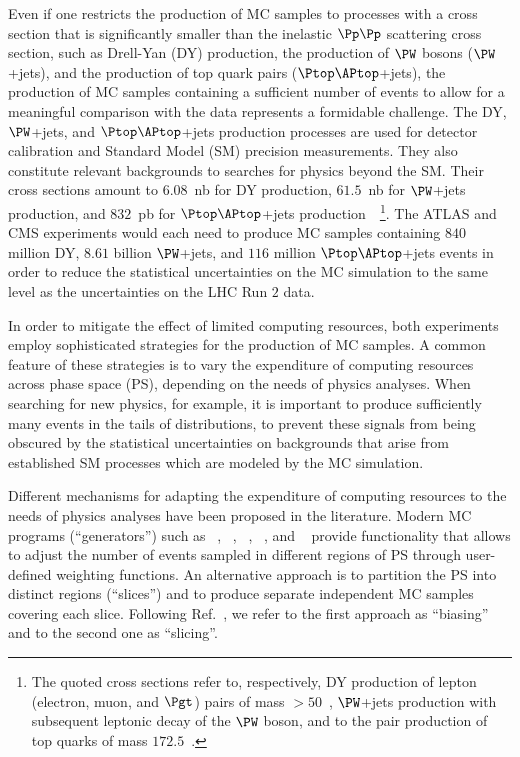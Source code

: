 Even if one restricts the production of MC samples to processes with a cross section that is significantly smaller than the inelastic $\Pp\Pp$ scattering cross section,
such as Drell-Yan (DY) production, the production of $\PW$ bosons ($\PW$+jets), and the production of top quark pairs ($\Ptop\APtop$+jets),
the production of MC samples containing a sufficient number of events to allow for a meaningful comparison with the data represents a formidable challenge.
The DY, $\PW$+jets, and $\Ptop\APtop$+jets production processes are used for detector calibration and Standard Model (SM) precision measurements.
They also constitute relevant backgrounds to searches for physics beyond the SM.
Their cross sections amount to $6.08$~nb for DY production, $61.5$~nb for $\PW$+jets production,
and $832$~pb for $\Ptop\APtop$+jets production~\cite{Melnikov:2006kv,Li:2012wna,Czakon:2011xx}~\footnote{
  The quoted cross sections refer to, respectively, DY production of lepton (electron, muon, and $\Pgt$) pairs of mass $> 50$~\GeV,
  $\PW$+jets production with subsequent leptonic decay of the $\PW$ boson,
  and to the pair production of top quarks of mass $172.5$~\GeV.
}.
The ATLAS and CMS experiments would each need to produce MC samples containing $840$ million DY, $8.61$ billion $\PW$+jets, and $116$ million $\Ptop\APtop$+jets events
in order to reduce the statistical uncertainties on the MC simulation to the same level as the uncertainties on the LHC Run $2$ data.

In order to mitigate the effect of limited computing resources, both experiments employ sophisticated strategies for the production of MC samples.
A common feature of these strategies is to vary the expenditure of computing resources across phase space (PS),
depending on the needs of physics analyses.
When searching for new physics, for example, it is important to produce sufficiently many events in the tails of distributions,
to prevent these signals from being obscured by the statistical uncertainties on backgrounds that arise from established SM processes which are modeled by the MC simulation.

Different mechanisms for adapting the expenditure of computing resources to the needs of physics analyses have been proposed in the literature.
Modern MC programs (``generators'') such as \POWHEG~\cite{POWHEG1,POWHEG2,POWHEG3}, \MGvATNLO~\cite{MGvATNLO}, \SHERPA~\cite{SHERPA}, \PYTHIA~\cite{PYTHIA}, and \HERWIG~\cite{HERWIG}
provide functionality that allows to adjust the number of events sampled in different regions of PS through user-defined weighting functions.
An alternative approach is to partition the PS into distinct regions (``slices'') and to produce separate independent MC samples covering each slice.
Following Ref.~\cite{HSFPhysicsEventGeneratorWG:2020gxw}, we refer to the first approach as ``biasing'' and to the second one as ``slicing''.


